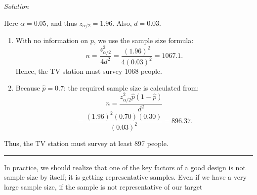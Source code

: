 \noindent\textit{Solution}

Here $\alpha = 0.05$, and thus $z_{\alpha/2} = 1.96$. Also, $d = 0.03$.
\begin{enumerate}
    \item[(a)] With no information on $p$, we use the sample size formula:
    \[
    n = \frac{z_{\alpha/2}^2}{4d^2} = \frac{(1.96)^2}{4(0.03)^2} = 1067.1.
    \]
    Hence, the TV station must survey 1068 people.
    \item[(b)] Because $\hat{p} = 0.7$: the required sample size is calculated from:
    \[
    n = \frac{z_{\alpha/2}^2 \hat{p}(1 - \hat{p})}{d^2}
    \]
    \[
    = \frac{(1.96)^2 (0.70)(0.30)}{(0.03)^2} = 896.37.
    \]
\end{enumerate}

Thus, the TV station must survey at least 897 people.

\begin{center}\rule{\linewidth}{0.4pt}\end{center}

In practice, we should realize that one of the key factors of a good design is not sample size by itself; it is getting representative samples. Even if we have a very large sample size, if the sample is not representative of our target
